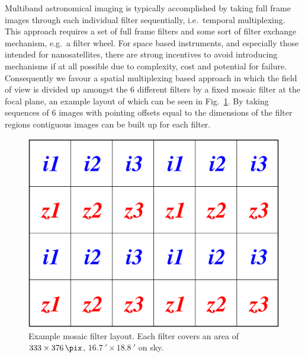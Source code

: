 \documentclass[]{iac}
\begin{document}
Multiband astronomical imaging is typically accomplished by taking full frame images through each individual filter
sequentially, i.e.\ temporal multiplexing. This approach requires a set of full frame filters and some sort of filter
exchange mechanism, e.g.\ a filter wheel. For space based instruments, and especially those intended for nanosatellites,
there are strong incentives to avoid introducing mechanisms if at all possible due to complexity, cost and potential for
failure. Consequently we favour a spatial multiplexing based approach in which the field of view is divided up amongst
the 6 different filters by a fixed mosaic filter at the focal plane, an example layout of which can be seen in
Fig.~\ref{fig:mosaic}. By taking sequences of 6 images with pointing offsets equal to the dimensions of the filter
regions contiguous images can be built up for each filter.

\begin{figure}[htp]
  \center \includegraphics[width=0.7\columnwidth]{figures/mosaic.pdf}
  \caption{\label{fig:mosaic}Example mosaic filter layout. Each filter covers an area of $333 \times \SI{376}{\pix}$,
    $\SI{16.7}{\arcminute} \times \SI{18.8}{\arcminute}$ on sky.}
\end{figure}
\end{document}
